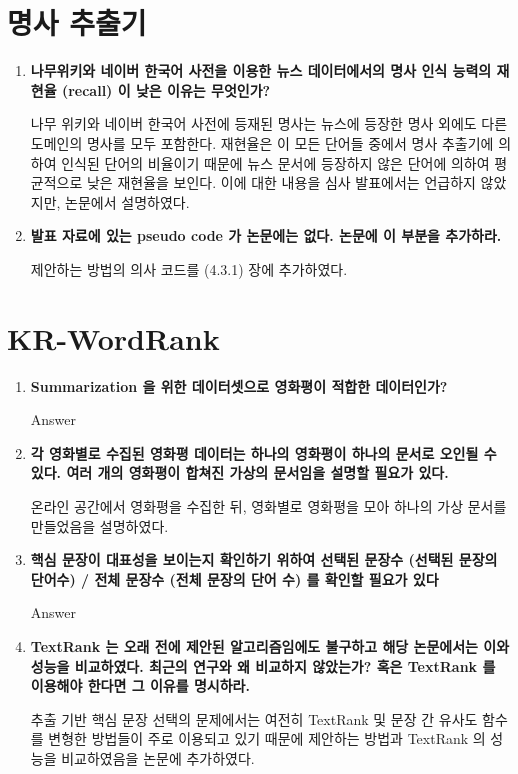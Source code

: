 \documentclass[11pt]{article}
\begin{document}
\section{명사 추출기}
\begin{enumerate}
\item \textbf{나무위키와 네이버 한국어 사전을 이용한 뉴스 데이터에서의 명사 인식 능력의 재현율 (recall) 이 낮은 이유는 무엇인가?}

나무 위키와 네이버 한국어 사전에 등재된 명사는 뉴스에 등장한 명사 외에도 다른 도메인의 명사를 모두 포함한다.
재현율은 이 모든 단어들 중에서 명사 추출기에 의하여 인식된 단어의 비율이기 때문에 뉴스 문서에 등장하지 않은 단어에 의하여 평균적으로 낮은 재현율을 보인다. 
이에 대한 내용을 심사 발표에서는 언급하지 않았지만, 논문에서 설명하였다.

\item \textbf{발표 자료에 있는 pseudo code 가 논문에는 없다. 논문에 이 부분을 추가하라.}

제안하는 방법의 의사 코드를 (4.3.1) 장에 추가하였다.

\end{enumerate}


\section{KR-WordRank}
\begin{enumerate}
\item \textbf{Summarization 을 위한 데이터셋으로 영화평이 적합한 데이터인가?}

Answer

\item \textbf{각 영화별로 수집된 영화평 데이터는 하나의 영화평이 하나의 문서로 오인될 수 있다. 여러 개의 영화평이 합쳐진 가상의 문서임을 설명할 필요가 있다.}

온라인 공간에서 영화평을 수집한 뒤, 영화별로 영화평을 모아 하나의 가상 문서를 만들었음을 설명하였다.

\item \textbf{핵심 문장이 대표성을 보이는지 확인하기 위하여 선택된 문장수 (선택된 문장의 단어수) / 전체 문장수 (전체 문장의 단어 수) 를 확인할 필요가 있다}

Answer

\item \textbf{TextRank 는 오래 전에 제안된 알고리즘임에도 불구하고 해당 논문에서는 이와 성능을 비교하였다. 최근의 연구와 왜 비교하지 않았는가? 혹은 TextRank 를 이용해야 한다면 그 이유를 명시하라.}

추출 기반 핵심 문장 선택의 문제에서는 여전히 TextRank 및 문장 간 유사도 함수를 변형한 방법들이 주로 이용되고 있기 때문에 제안하는 방법과 TextRank 의 성능을 비교하였음을 논문에 추가하였다.

\end{enumerate}
\end{document}
